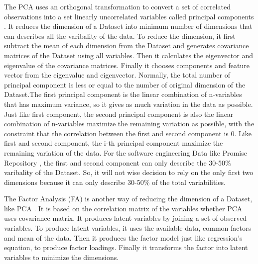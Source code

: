 \documentclass[12pt]{report}
\begin{document}
The PCA uses an orthogonal transformation to convert a set of correlated observations into a set linearly uncorrelated variables called principal components \cite{abdi2010principal,wold1987principal,jolliffe2002principal}. It reduces the dimension of a Dataset into minimum number of dimensions that can describes all the varibality of the data. To reduce the dimension, it first subtract the mean of each dimension from the Dataset and generates covariance matrices of the Dataset using all variables. Then it calculates the eigenvector and eigenvalue of the covariance matrices. Finally it chooses components and feature vector from the eigenvalue and eigenvector. Normally, the total number of principal component is less or equal to the number of original dimension of the Dataset.The first principal component is the linear combination of n-variables that has maximum variance, so it gives as much variation in the data as possible. Just like first component, the second principal component is also the linear combination of n-variables maximize the remaining variation as possible, with the constraint that the correlation between the first and second component is $0$. Like first and second component, the i-th principal component maximize the remaining variation of the data. For the software engineering Data like Promise Repository \cite{promise12}, the first and second component can only describe the 30-50\% varibality of the Dataset. So, it will not wise decision to rely on the only first two dimensions because it can only describe 30-50\% of the total variabilities.



The Factor Analysis (FA) is another way of reducing the dimension of a Dataset, like PCA \cite{malinowski2002factor,kim1978introduction}. It is based on the correlation matrix of the variables whether PCA uses covariance matrix. It produces latent variables by joining a set of observed variables. To produce latent variables, it uses the available data, common factors and mean of the data. Then it produces the factor model just like regression's equation, to produce factor loadings. Finally it transforms the factor into latent variables to minimize the dimensions.

\end{document}
